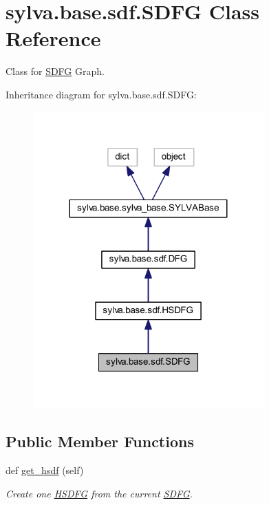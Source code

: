 \hypertarget{classsylva_1_1base_1_1sdf_1_1_s_d_f_g}{}\section{sylva.\+base.\+sdf.\+S\+D\+FG Class Reference}
\label{classsylva_1_1base_1_1sdf_1_1_s_d_f_g}


Class for \hyperlink{classsylva_1_1base_1_1sdf_1_1_s_d_f_g}{S\+D\+FG} Graph.  




Inheritance diagram for sylva.\+base.\+sdf.\+S\+D\+FG\+:\nopagebreak
\begin{figure}[H]
\begin{center}
\leavevmode
\includegraphics[width=251pt]{classsylva_1_1base_1_1sdf_1_1_s_d_f_g__inherit__graph}
\end{center}
\end{figure}
\subsection*{Public Member Functions}
\begin{DoxyCompactItemize}
\item 
def \hyperlink{classsylva_1_1base_1_1sdf_1_1_s_d_f_g_a66a5aaee4dc1232667e724e318f17008}{get\+\_\+hsdf} (self)
\begin{DoxyCompactList}\small\item\em Create one \hyperlink{classsylva_1_1base_1_1sdf_1_1_h_s_d_f_g}{H\+S\+D\+FG} from the current \hyperlink{classsylva_1_1base_1_1sdf_1_1_s_d_f_g}{S\+D\+FG}. \end{DoxyCompactList}\end{DoxyCompactItemize}

